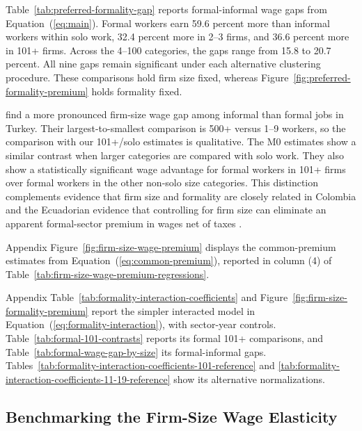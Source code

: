 Table~\ref{tab:preferred-formality-gap} reports formal-informal wage gaps
from Equation~(\ref{eq:main}). Formal workers earn 59.6 percent more
than informal workers within solo work, 32.4 percent more in 2--3 firms,
and 36.6 percent more in 101+ firms. Across the 4--100 categories, the gaps
range from 15.8 to 20.7 percent. All nine gaps remain significant under
each alternative clustering procedure. These comparisons hold firm size fixed, whereas
Figure~\ref{fig:preferred-formality-premium} holds formality fixed.



\citet{BalkanTumen2016} find a more pronounced firm-size wage gap among informal
than formal jobs in Turkey. Their largest-to-smallest comparison is 500+ versus
1--9 workers, so the comparison with our 101+/solo estimates is qualitative.
The M0 estimates show a similar contrast
when larger categories are compared with solo work. They also show a
statistically significant wage advantage for formal workers in 101+ firms
over formal workers in the other non-solo size categories. This distinction complements evidence that firm
size and formality are closely related in Colombia
\citep{OteroCortesEtAl2025,DazaGamboa2013,GutierrezRodriguezLesmes2023} and the
Ecuadorian evidence that controlling for firm size can eliminate an apparent
formal-sector premium in wages net of taxes \citep{ElBadaouiStroblWalsh2010}.

Appendix Figure~\ref{fig:firm-size-wage-premium} displays the common-premium
estimates from Equation~(\ref{eq:common-premium}), reported in column (4) of
Table~\ref{tab:firm-size-wage-premium-regressions}.

Appendix Table~\ref{tab:formality-interaction-coefficients} and
Figure~\ref{fig:firm-size-formality-premium} report the simpler interacted
model in Equation~(\ref{eq:formality-interaction}), with sector-year controls.
Table~\ref{tab:formal-101-contrasts} reports its
formal 101+ comparisons, and Table~\ref{tab:formal-wage-gap-by-size} its
formal-informal gaps. Tables~\ref{tab:formality-interaction-coefficients-101-reference}
and \ref{tab:formality-interaction-coefficients-11-19-reference} show its
alternative normalizations.





\subsection{Benchmarking the Firm-Size Wage Elasticity}
\label{subsec:elasticity-benchmark}

